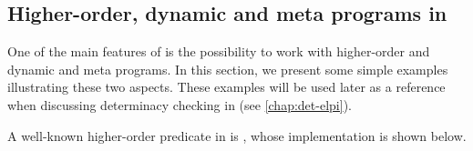 










\subsection{Higher-order, dynamic and meta programs in \elpi}
\label{sec:example-ho-dyn-programs}

One of the main features of \elpi is the possibility to work with
higher-order and dynamic and meta programs. In this section, we present some simple
examples illustrating these two aspects. These examples will be used later as a
reference when discussing determinacy checking in \elpi (see
\cref{chap:det-elpi}).

 A well-known higher-order predicate in \elpi is , whose
implementation is shown below.

\phantom{aa}

